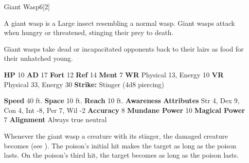   \begin{monsection}{Giant Wasp}{6}[2]
    \vspace{-1em}\vspace{-1em}
    \vspace{0em}

    
        A giant wasp is a Large insect resembling a normal wasp.
        Giant wasps attack when hungry or threatened, stinging their prey to death.
      
        Giant wasps take dead or incapacitated opponents back to their lairs as food for their unhatched young.
      

    \begin{spellcontent}
      \begin{spelltargetinginfo}
        \pari \textbf{HP} 10 \monsep
          \textbf{AD} 17 \monsep
          \textbf{Fort} 12 \monsep
          \textbf{Ref} 14 \monsep
          \textbf{Ment} 7
        \pari \textbf{WR} Physical 13, Energy 10 \monsep
        \textbf{VR} Physical 33, Energy 30
        \pari \textbf{Strike:}
            Stinger  (4d8 piercing)
      \end{spelltargetinginfo}
    \end{spellcontent}
    \begin{monsterfooter}
      \pari \textbf{Speed} 40 ft. \monsep
        \textbf{Space} 10 ft. \monsep
        \textbf{Reach} 10 ft.
      \pari \textbf{Awareness} 
      \pari \textbf{Attributes}
        Str 4, Dex 9,
        Con 4, Int -8,
        Per 7, Wil -2
      \pari \textbf{Accuracy} 8 \monsep
        \textbf{Mundane Power} 10 \monsep
      \textbf{Magical Power} 7
      \pari \textbf{Alignment} Always true neutral
    \end{monsterfooter}
  \end{monsection}
          Whenever the giant wasp  a creature with its stinger,
            the damaged creature becomes  (see ).
          The poison's initial hit makes the target  as long as the poison lasts.
          On the poison's third hit, the target becomes  as long as the poison lasts.
  
